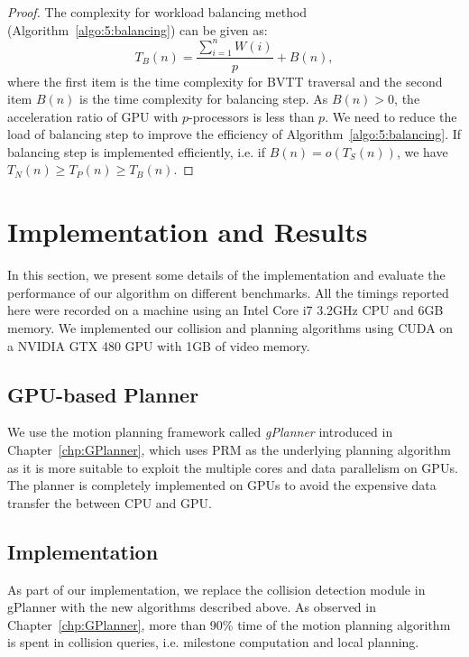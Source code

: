 \begin{proof}
The complexity for workload balancing method (Algorithm~\ref{algo:5:balancing}) can be given as: $$T_B(n) = \frac{\sum_{i=1}^n W(i)}{p} + B(n),$$ where the first item is the time complexity for BVTT traversal and the second item $B(n)$ is the time complexity for balancing step. As $B(n) > 0$, the acceleration ratio of GPU with $p$-processors is less than $p$. We need to reduce the load of balancing step to improve the efficiency of Algorithm~\ref{algo:5:balancing}. If balancing step is implemented efficiently, i.e. if $B(n) = o(T_S(n))$, we have $T_N(n) \geq T_P(n) \geq T_B(n)$.
\end{proof}



\section{Implementation and Results}
\label{sec:5:result}


In this section, we present some details of the implementation and evaluate the performance of our algorithm
on different benchmarks. All the timings reported here were recorded on a machine using an Intel Core i7 3.2GHz CPU and 6GB
memory. We implemented our collision and planning algorithms using CUDA on a NVIDIA GTX 480 GPU with 1GB of video memory.

\subsection{GPU-based Planner}
We use the motion planning framework called \emph{gPlanner} introduced in Chapter~\ref{chp:GPlanner}, which uses PRM
as the underlying planning algorithm as it is more suitable to exploit the multiple cores and data parallelism on GPUs. The planner is completely implemented on GPUs to avoid the expensive data transfer the between CPU and GPU.


\subsection{Implementation}
As part of our implementation, we replace the collision detection module in gPlanner with the new algorithms described above.
As observed in Chapter~\ref{chp:GPlanner}, more than 90\% time of the motion planning algorithm is spent in collision queries, i.e. milestone computation and local planning.

